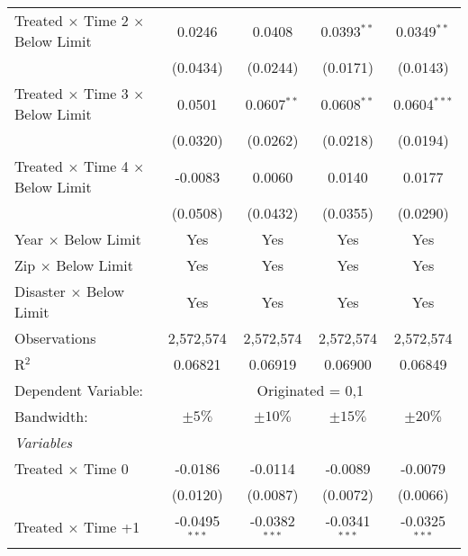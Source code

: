 \begin{tabular*}{0.8\textwidth}{@{\extracolsep{\fill}}lcccc}
   Treated $\times$ Time 2 $\times$ Below Limit     & 0.0246          & 0.0408          & 0.0393$^{**}$   & 0.0349$^{**}$\\   
                                                    & (0.0434)        & (0.0244)        & (0.0171)        & (0.0143)\\   
   Treated $\times$ Time 3 $\times$ Below Limit     & 0.0501          & 0.0607$^{**}$   & 0.0608$^{**}$   & 0.0604$^{***}$\\   
                                                    & (0.0320)        & (0.0262)        & (0.0218)        & (0.0194)\\   
   Treated $\times$ Time 4 $\times$ Below Limit     & -0.0083         & 0.0060          & 0.0140          & 0.0177\\   
                                                    & (0.0508)        & (0.0432)        & (0.0355)        & (0.0290)\\   
   \midrule
   Year $\times$ Below Limit                                & Yes             & Yes             & Yes             & Yes\\  
   Zip $\times$ Below Limit                                 & Yes             & Yes             & Yes             & Yes\\  
   Disaster $\times$ Below Limit                            & Yes             & Yes             & Yes             & Yes\\  
   \midrule
   Observations                                        & 2,572,574       & 2,572,574       & 2,572,574       & 2,572,574\\  
   R$^2$                                               & 0.06821         & 0.06919         & 0.06900         & 0.06849\\  
   \midrule
   Dependent Variable: & \multicolumn{4}{c}{Originated = 0,1}\\
   Bandwidth:                                         & $\pm5\%$             & $\pm10\%$           & $\pm15\%$            & $\pm20\%$   \\  
   \midrule
   \emph{Variables}\\
    Treated $\times$ Time 0                         & -0.0186         & -0.0114         & -0.0089         & -0.0079\\   
                                                    & (0.0120)        & (0.0087)        & (0.0072)        & (0.0066)\\   
    Treated $\times$ Time +1                        & -0.0495$^{***}$ & -0.0382$^{***}$ & -0.0341$^{***}$ & -0.0325$^{***}$\\   

\end{tabular*}
